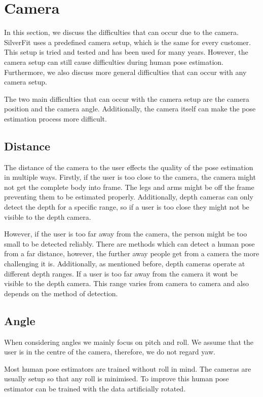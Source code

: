 \section{Camera}

In this section, we discuss the difficulties that can occur due to the camera. SilverFit uses a predefined camera setup, which is the same for every customer. This setup is tried and tested and has been used for many years. However, the camera setup can still cause difficulties during human pose estimation. Furthermore, we also discuss more general difficulties that can occur with any camera setup.

The two main difficulties that can occur with the camera setup are the camera position and the camera angle. Additionally, the camera itself can make the pose estimation process more difficult.

\subsection{Distance}

The distance of the camera to the user effects the quality of the pose estimation in multiple ways. Firstly, if the user is too close to the camera, the camera might not get the complete body into frame. The legs and arms might be off the frame preventing them to be estimated properly. Additionally, depth cameras can only detect the depth for a specific range, so if a user is too close they might not be visible to the depth camera.

However, if the user is too far away from the camera, the person might be too small to be detected reliably. There are methods which can detect a human pose from a far distance, however, the further away people get from a camera the more challenging it is. Additionally, as mentioned before, depth cameras operate at different depth ranges. If a user is too far away from the camera it wont be visible to the depth camera. This range varies from camera to camera and also depends on the method of detection.

\subsection{Angle}

When considering angles we mainly focus on pitch and roll. We assume that the user is in the centre of the camera, therefore, we do not regard yaw.

Most human pose estimators are trained without roll in mind. The cameras are usually setup so that any roll is minimised. To improve this human pose estimator can be trained with the data artificially rotated.

